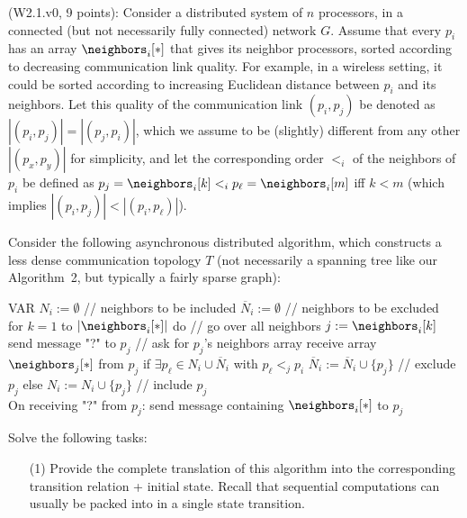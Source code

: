 
\begin{Exc}{(W2.1.v0, 9 points):}
Consider a distributed system of $n$ processors, in a
connected (but not necessarily fully connected) network $G$.
Assume that every $p_i$ has
an array $\neighbors_i[*]$ that gives its neighbor processors,
sorted according to decreasing communication link quality.
For example, in a wireless setting, it could be sorted according
to increasing Euclidean distance between $p_i$ and its neighbors.
Let this quality of the communication link $(p_i,p_j)$ be
denoted as $|(p_i,p_j)|=|(p_j,p_i)|$, which we assume to be (slightly)
different from any other $|(p_x,p_y)|$ for simplicity, and let
the corresponding order $<_i$
of the neighbors of $p_i$ be defined as
$p_j=\neighbors_i[k] <_i p_\ell=\neighbors_i[m]$ iff $k<m$ (which
implies $|(p_i,p_j)|<|(p_i,p_\ell)|$).

Consider the following asynchronous distributed algorithm, which constructs
a less dense communication topology $T$ (not necessarily a spanning
tree like our Algorithm~2, but typically a fairly sparse graph):

\begin{code}%
\vspace*{-1cm}%
\NL
{}\NL
VAR $N_i := \emptyset$ // neighbors to be included\NL
\> $\overline{N}_i := \emptyset$ // neighbors to be excluded\\
\NL
for $k=1$ to $|\neighbors_i[*]|$ do // go over all neighbors\NL
\> $j := \neighbors_i[k]$\NL
\> send message "?" to $p_j$ // ask for $p_j$'s neighbors array\NL
\> receive array $\neighbors_j[*]$ from $p_j$\NL
\> if $\exists p_\ell \in N_i \cup \overline{N}_i$ with $p_\ell <_j p_i$\NL
\>\> $\overline{N}_i := \overline{N}_i \cup \{p_j\}$ // exclude $p_j$\NL
\> else\NL
\>\> $N_i := N_i \cup \{p_j\}$ // include $p_j$\\
\NL
On receiving "?" from $p_j$:\NL
\> send message containing $\neighbors_i[*]$ to $p_j$
\end{code}

Solve the following tasks:
\begin{enumerate}
\item[(1)] Provide the complete translation of this algorithm into the corresponding
transition relation + initial state. Recall that sequential computations can
usually be packed into in a single state transition.


\end{enumerate}
\end{Exc}
